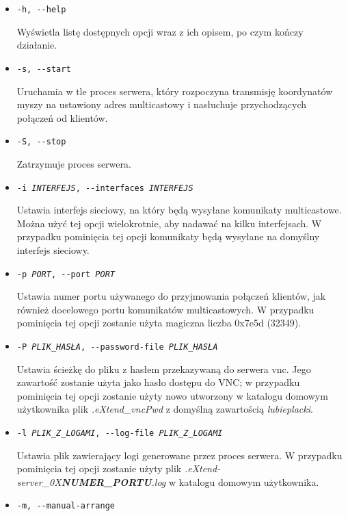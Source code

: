   \begin{itemize}
    \item \texttt{-h, -{}-help}

      Wyświetla listę dostępnych opcji wraz z ich opisem, po czym kończy działanie.

    \item \texttt{-s, -{}-start}

      Uruchamia w tle proces serwera, który rozpoczyna transmisję koordynatów myszy na ustawiony adres multicastowy i nasłuchuje przychodzących połączeń od klientów.

    \item \texttt{-S, -{}-stop}

      Zatrzymuje proces serwera.

    \item \texttt{-i \emph{INTERFEJS}, -{}-interfaces \emph{INTERFEJS}}

      Ustawia interfejs sieciowy, na który będą wysyłane komunikaty multicastowe. Można użyć tej opcji wielokrotnie, aby nadawać na kilku interfejsach. W przypadku pominięcia tej opcji komunikaty będą wysyłane na domyślny interfejs sieciowy.

    \item \texttt{-p \emph{PORT}, -{}-port \emph{PORT}}

      Ustawia numer portu używanego do przyjmowania połączeń klientów, jak również docelowego portu komunikatów multicastowych. W przypadku pominięcia tej opcji zostanie użyta magiczna liczba 0x7e5d (32349).

    \item \texttt{-P \emph{PLIK\_HASŁA}, -{}-password-file \emph{PLIK\_HASŁA}}

      Ustawia ścieżkę do pliku z hasłem przekazywaną do serwera vnc. Jego zawartość zostanie użyta jako hasło dostępu do VNC; w przypadku pominięcia tej opcji zostanie użyty nowo utworzony w katalogu domowym użytkownika plik \emph{.eXtend\_vncPwd} z domyślną zawartością \emph{lubieplacki}.

    \item \texttt{-l \emph{PLIK\_Z\_LOGAMI}, -{}-log-file \emph{PLIK\_Z\_LOGAMI}}

      Ustawia plik zawierający logi generowane przez proces serwera. W przypadku pominięcia tej opcji zostanie użyty plik \emph{.eXtend-server\_0X\textbf{NUMER\_PORTU}.log} w katalogu domowym użytkownika.

    \item \texttt{-m, -{}-manual-arrange}


\end{itemize}
